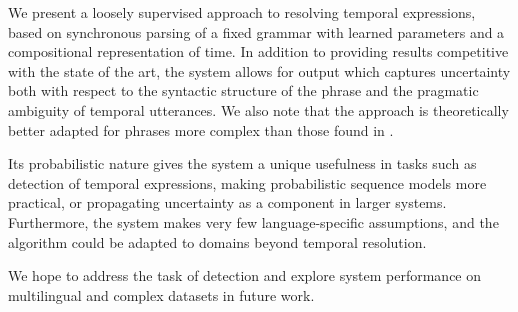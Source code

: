 We present a loosely supervised approach to resolving temporal expressions,
	based on synchronous parsing of a fixed grammar with learned parameters
	and a compositional representation of time.
In addition to providing results competitive with the state of the art,
	the system allows for output which captures uncertainty both with respect to 
	the syntactic structure of the phrase and the pragmatic ambiguity of 
	temporal utterances.
We also note that the approach is theoretically better adapted for
	phrases more complex than those found in \tempeval.

Its probabilistic nature gives the system a unique usefulness
	in tasks such as detection of temporal expressions, making probabilistic
	sequence models more practical, or propagating uncertainty as a
	component in larger systems.
Furthermore, the system makes very few language-specific assumptions,
	and the algorithm could be adapted to domains beyond temporal resolution.

We hope to address the task of detection and explore system performance
	on multilingual and complex datasets in future work.
